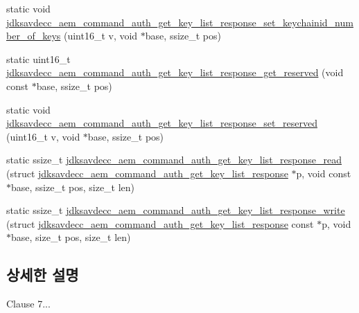 \begin{DoxyCompactItemize}
\item 
static void \hyperlink{group__command__auth__get__key__list__response_ga246ee49705a0fe31e695955a090e36d6}{jdksavdecc\+\_\+aem\+\_\+command\+\_\+auth\+\_\+get\+\_\+key\+\_\+list\+\_\+response\+\_\+set\+\_\+keychainid\+\_\+number\+\_\+of\+\_\+keys} (uint16\+\_\+t v, void $\ast$base, ssize\+\_\+t pos)
\item 
static uint16\+\_\+t \hyperlink{group__command__auth__get__key__list__response_ga3a8d0ff5de5601080c9f4af749d445ff}{jdksavdecc\+\_\+aem\+\_\+command\+\_\+auth\+\_\+get\+\_\+key\+\_\+list\+\_\+response\+\_\+get\+\_\+reserved} (void const $\ast$base, ssize\+\_\+t pos)
\item 
static void \hyperlink{group__command__auth__get__key__list__response_ga4c613b358da2310fdadf31fcfae08e45}{jdksavdecc\+\_\+aem\+\_\+command\+\_\+auth\+\_\+get\+\_\+key\+\_\+list\+\_\+response\+\_\+set\+\_\+reserved} (uint16\+\_\+t v, void $\ast$base, ssize\+\_\+t pos)
\item 
static ssize\+\_\+t \hyperlink{group__command__auth__get__key__list__response_ga07f614d8342a52c42e4bf41253df8b76}{jdksavdecc\+\_\+aem\+\_\+command\+\_\+auth\+\_\+get\+\_\+key\+\_\+list\+\_\+response\+\_\+read} (struct \hyperlink{structjdksavdecc__aem__command__auth__get__key__list__response}{jdksavdecc\+\_\+aem\+\_\+command\+\_\+auth\+\_\+get\+\_\+key\+\_\+list\+\_\+response} $\ast$p, void const $\ast$base, ssize\+\_\+t pos, size\+\_\+t len)
\item 
static ssize\+\_\+t \hyperlink{group__command__auth__get__key__list__response_ga02ae99519231680319c8f8bfd123c81b}{jdksavdecc\+\_\+aem\+\_\+command\+\_\+auth\+\_\+get\+\_\+key\+\_\+list\+\_\+response\+\_\+write} (struct \hyperlink{structjdksavdecc__aem__command__auth__get__key__list__response}{jdksavdecc\+\_\+aem\+\_\+command\+\_\+auth\+\_\+get\+\_\+key\+\_\+list\+\_\+response} const $\ast$p, void $\ast$base, size\+\_\+t pos, size\+\_\+t len)
\end{DoxyCompactItemize}


\subsection{상세한 설명}
Clause 7... 


